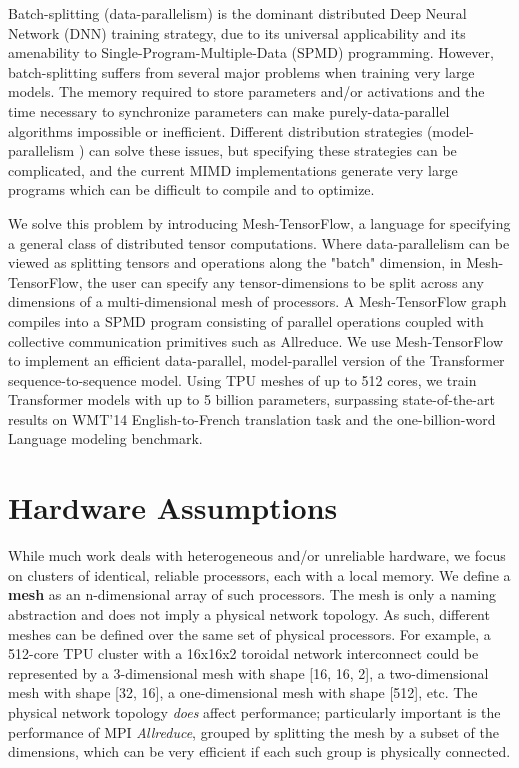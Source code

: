 \documentclass{article}
\begin{document}
Batch-splitting (data-parallelism) is the dominant distributed Deep Neural Network (DNN) training strategy, due to its universal applicability and its amenability to Single-Program-Multiple-Data (SPMD) programming.  However, batch-splitting suffers from several major problems when training very large models.  The memory required to store parameters and/or activations and the time necessary to synchronize parameters can make purely-data-parallel algorithms impossible or inefficient.  Different distribution strategies (model-parallelism \cite{Dean:2012:LSD:2999134.2999271}) can solve these issues, but specifying these strategies can be complicated, and the current MIMD implementations generate very large programs which can be difficult to compile and to optimize.

We solve this problem by introducing Mesh-TensorFlow, a language for specifying a general class of distributed tensor computations.  Where data-parallelism can be viewed as splitting tensors and operations along the "batch" dimension, in Mesh-TensorFlow, the user can specify any tensor-dimensions to be split across any dimensions of a multi-dimensional mesh of processors.  A Mesh-TensorFlow graph compiles into a SPMD program consisting of parallel operations coupled with collective communication primitives such as Allreduce.  We use Mesh-TensorFlow to implement an efficient data-parallel, model-parallel version of the Transformer \cite{Vaswani17} sequence-to-sequence model.  Using TPU meshes of up to 512 cores, we train Transformer models with up to 5 billion parameters, surpassing state-of-the-art results on WMT'14 English-to-French translation task and the one-billion-word Language modeling benchmark.





\section{Hardware Assumptions} \label{sec:mesh}
While much work deals with heterogeneous and/or unreliable hardware, we focus on clusters of identical, reliable processors, each with a local memory.  We define a \textbf{mesh} as an n-dimensional array of such processors.  The mesh is only a naming abstraction and does not imply a physical network topology.  As such, different meshes can be defined over the same set of physical processors.  For example, a 512-core TPU cluster with a 16x16x2 toroidal network interconnect could be represented by a 3-dimensional mesh with shape [16, 16, 2], a two-dimensional mesh with shape [32, 16], a one-dimensional mesh with shape [512], etc. The physical network topology \textit{does} affect performance; particularly important is the performance of MPI \textit{Allreduce}, grouped by splitting the mesh by a subset of the dimensions, which can be very efficient \cite{Patarasuk2009} \cite{Jain10y.:optimal} if each such group is physically connected.
\end{document}
